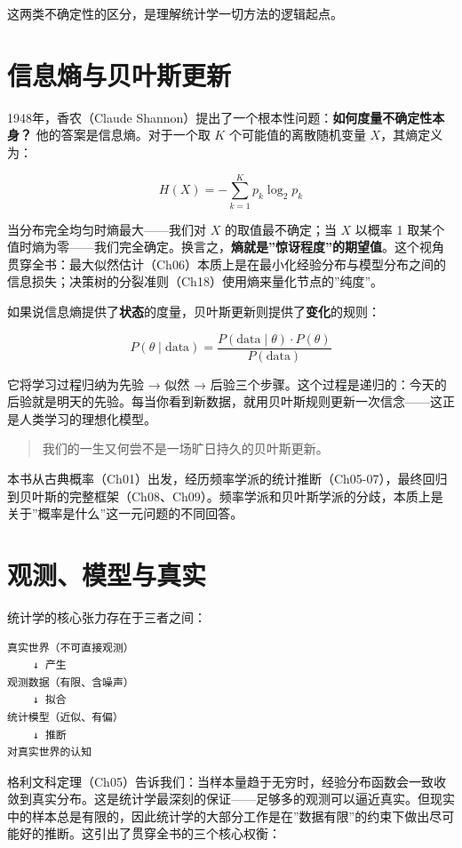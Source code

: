\documentclass[
]{book}
\begin{document}
这两类不确定性的区分，是理解统计学一切方法的逻辑起点。

\section{信息熵与贝叶斯更新}\label{ux4fe1ux606fux71b5ux4e0eux8d1dux53f6ux65afux66f4ux65b0}

1948年，香农（Claude Shannon）提出了一个根本性问题：\textbf{如何度量不确定性本身？} 他的答案是信息熵。对于一个取 \(K\) 个可能值的离散随机变量 \(X\)，其熵定义为：

\[H(X) = -\sum_{k=1}^{K} p_k \log_2 p_k\]

当分布完全均匀时熵最大------我们对 \(X\) 的取值最不确定；当 \(X\) 以概率 1 取某个值时熵为零------我们完全确定。换言之，\textbf{熵就是''惊讶程度''的期望值}。这个视角贯穿全书：最大似然估计（Ch06）本质上是在最小化经验分布与模型分布之间的信息损失；决策树的分裂准则（Ch18）使用熵来量化节点的''纯度''。

如果说信息熵提供了\textbf{状态}的度量，贝叶斯更新则提供了\textbf{变化}的规则：

\[P(\theta \mid \text{data}) = \frac{P(\text{data} \mid \theta) \cdot P(\theta)}{P(\text{data})}\]

它将学习过程归纳为先验 → 似然 → 后验三个步骤。这个过程是递归的：今天的后验就是明天的先验。每当你看到新数据，就用贝叶斯规则更新一次信念------这正是人类学习的理想化模型。

\begin{quote}
我们的一生又何尝不是一场旷日持久的贝叶斯更新。
\end{quote}

本书从古典概率（Ch01）出发，经历频率学派的统计推断（Ch05-07），最终回归到贝叶斯的完整框架（Ch08、Ch09）。频率学派和贝叶斯学派的分歧，本质上是关于''概率是什么''这一元问题的不同回答。

\section{观测、模型与真实}\label{ux89c2ux6d4bux6a21ux578bux4e0eux771fux5b9e}

统计学的核心张力存在于三者之间：

\begin{verbatim}
真实世界（不可直接观测）
    ↓ 产生
观测数据（有限、含噪声）
    ↓ 拟合
统计模型（近似、有偏）
    ↓ 推断
对真实世界的认知
\end{verbatim}

格利文科定理（Ch05）告诉我们：当样本量趋于无穷时，经验分布函数会一致收敛到真实分布。这是统计学最深刻的保证------足够多的观测可以逼近真实。但现实中的样本总是有限的，因此统计学的大部分工作是在''数据有限''的约束下做出尽可能好的推断。这引出了贯穿全书的三个核心权衡：
\end{document}
